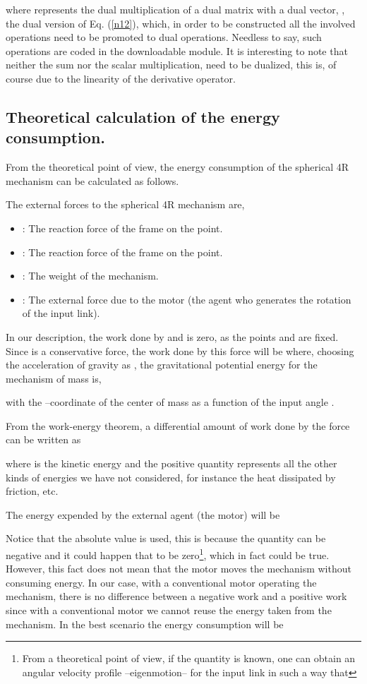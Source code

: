 \documentclass[11pt]{article}
\begin{document}
where   represents the dual multiplication of a dual 
matrix with a dual vector, , 
 the dual version of Eq. (\ref{n12}), which,
in order to be constructed all the involved operations need to be 
promoted to dual operations. Needless to say, such operations are coded in 
the downloadable module. It is interesting to note that neither the sum 
nor the scalar multiplication, need to be dualized, this is, of course 
due to the linearity of the derivative operator.

\subsection{Theoretical calculation of the energy consumption.}
From the theoretical point of view, the energy consumption of the
spherical 4R mechanism can be calculated as follows.

The external forces to the spherical 4R mechanism are,
\begin{itemize}
\item
: The reaction force of the frame on the  
point.

\item
: The reaction force of the frame on the  
point.

\item
 : The weight of the mechanism.

\item
: The external force due to the motor (the agent who 
generates the rotation of the input link).
\end{itemize}

In our description, the work done by  and  
is zero, as the points  and  are fixed.
Since  is a conservative force, the work done by this 
force will be   where, choosing the 
acceleration of gravity as , the  
gravitational potential energy for the mechanism of mass  is,

with  the --coordinate of the center of mass as a 
function of the input angle .

From the work-energy theorem, a differential amount of work done by the 
force  can be written as

where  is the kinetic energy and the positive quantity 
 represents all the other kinds of energies we 
have not considered, for instance the heat dissipated by friction, etc.

The energy expended by the external agent (the motor) will be

 
Notice that the absolute value is used, this is because the quantity 
 can be negative and it could happen that  to be zero\footnote{From a theoretical point of 
view, if the quantity  is known, one can 
obtain an angular velocity profile --eigenmotion-- for the input link in 
such a way that }, which in fact could 
be true. However, this fact does not mean that the motor moves the 
mechanism without consuming energy.  In our case, with a conventional 
motor operating the mechanism, there is no difference between a negative 
work and a positive work since with a conventional motor we cannot reuse 
the energy taken from the mechanism. In the best 
scenario the energy consumption will be 
\end{document}
